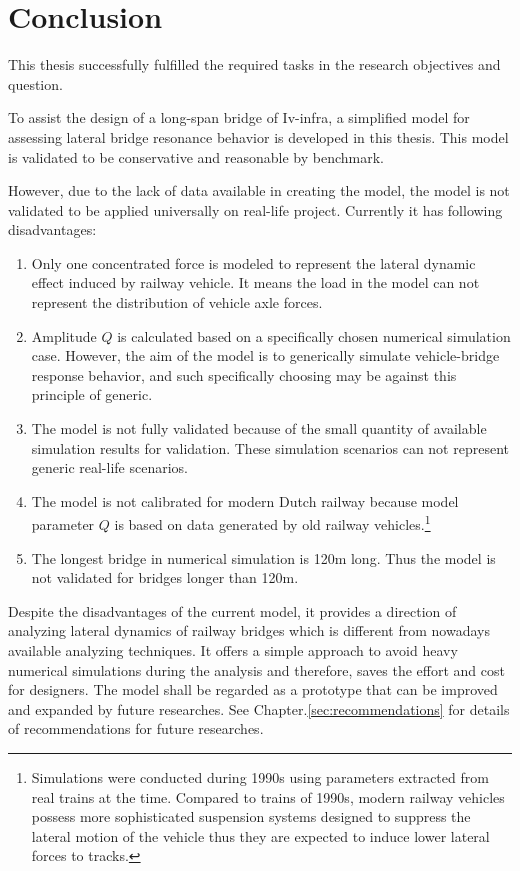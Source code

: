 
\chapter{Conclusion}

This thesis successfully fulfilled the required tasks in the research objectives and question.

To assist the design of a long-span bridge of Iv-infra, a simplified model for assessing lateral bridge resonance behavior is developed in this thesis. This model is validated to be conservative and reasonable by benchmark. 

However, due to the lack of data available in creating the model, the model is not validated to be applied universally on real-life project. Currently it has following disadvantages:

\begin{enumerate}
	\item Only one concentrated force is modeled to represent the lateral dynamic effect induced by railway vehicle. It means the load in the model can not represent the distribution of vehicle axle forces. 
	\item Amplitude $Q$ is calculated based on a specifically chosen numerical simulation case. However, the aim of the model is to generically simulate vehicle-bridge response behavior, and such specifically choosing may be against this principle of generic.  
	\item The model is not fully validated because of the small quantity of available simulation results for validation. These simulation scenarios can not represent generic real-life scenarios.
	\item The model is not calibrated for modern Dutch railway because model parameter $Q$ is based on data generated by old railway vehicles.\footnote{Simulations\citep{d181dt329} were conducted during 1990s using parameters extracted from real trains at the time. Compared to trains of 1990s, modern railway vehicles possess more sophisticated suspension systems designed to suppress the lateral motion of the vehicle thus they are expected to induce lower lateral forces to tracks.} 
	\item The longest bridge in numerical simulation is 120m long. Thus the model is not validated for bridges longer than 120m.
\end{enumerate}

Despite the disadvantages of the current model, it provides a direction of analyzing lateral dynamics of railway bridges which is different from nowadays available analyzing techniques. It offers a simple approach to avoid heavy numerical simulations during the analysis and therefore, saves the effort and cost for designers. The model shall be regarded as a prototype that can be improved and expanded by future researches. See Chapter.\ref{sec:recommendations} for details of recommendations for future researches.